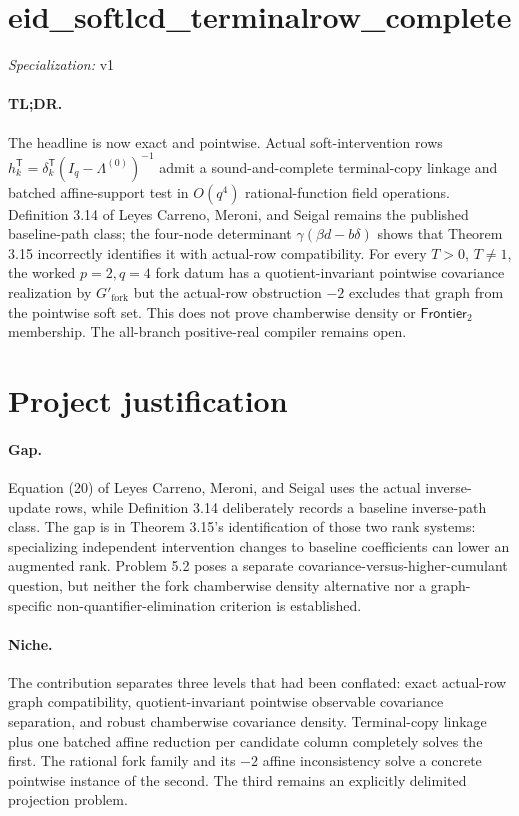 \documentclass{article}
\begin{document}
\sloppy

\section*{eid\_\allowbreak{}softlcd\_\allowbreak{}terminalrow\_\allowbreak{}complete}

\noindent\textit{Specialization:} v1\par

\paragraph{TL;DR.} The headline is now exact and pointwise. Actual soft-intervention rows \(h_k^{\mathsf T}=\delta_k^{\mathsf T}(I_q-\Lambda^{(0)})^{-1}\) admit a sound-and-complete terminal-copy linkage and batched affine-support test in \(O(q^4)\) rational-function field operations. Definition 3.14 of Leyes Carreno, Meroni, and Seigal remains the published baseline-path class; the four-node determinant \(\gamma(\beta d-b\delta)\) shows that Theorem 3.15 incorrectly identifies it with actual-row compatibility. For every \(T>0\), \(T\ne1\), the worked \(p=2,q=4\) fork datum has a quotient-invariant pointwise covariance realization by \(G'_{\mathrm{fork}}\) but the actual-row obstruction \(-2\) excludes that graph from the pointwise soft set. This does not prove chamberwise density or \(\mathsf{Frontier}_2\) membership. The all-branch positive-real compiler remains open.

\section{Project justification}

\paragraph{Gap.} Equation (20) of Leyes Carreno, Meroni, and Seigal uses the actual inverse-update rows, while Definition 3.14 deliberately records a baseline inverse-path class. The gap is in Theorem 3.15's identification of those two rank systems: specializing independent intervention changes to baseline coefficients can lower an augmented rank. Problem 5.2 poses a separate covariance-versus-higher-cumulant question, but neither the fork chamberwise density alternative nor a graph-specific non-quantifier-elimination criterion is established.

\paragraph{Niche.} The contribution separates three levels that had been conflated: exact actual-row graph compatibility, quotient-invariant pointwise observable covariance separation, and robust chamberwise covariance density. Terminal-copy linkage plus one batched affine reduction per candidate column completely solves the first. The rational fork family and its \(-2\) affine inconsistency solve a concrete pointwise instance of the second. The third remains an explicitly delimited projection problem.
\end{document}
